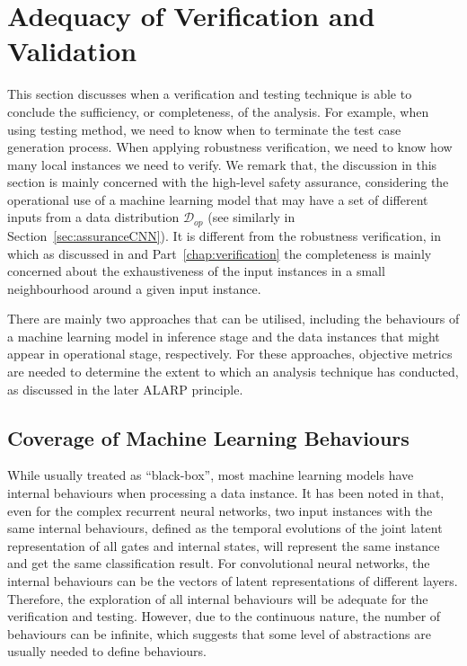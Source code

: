 \section{Adequacy of Verification and Validation}

This section discusses when a verification and testing technique is able to conclude the sufficiency, or completeness, of the analysis. For example, when using testing method, we need to know when to terminate the test case generation process. When applying robustness verification, we need to know how many local instances we need to verify. We remark that, the discussion in this section is mainly concerned with the high-level safety assurance, considering the operational use of a machine learning model that may have a set of different inputs from a data distribution $\mathcal{D}_{op}$ (see similarly in Section~\ref{sec:assuranceCNN}). It is different from the robustness verification, in which as discussed in \cite{HUANG2020100270} and Part~\ref{chap:verification} the completeness is mainly concerned about the exhaustiveness of the input instances in a small neighbourhood around a given input instance. 

There are mainly two approaches that can be utilised, including the behaviours of a machine learning model in inference stage and the data instances that might appear in operational stage, respectively. For these approaches, objective metrics are needed to determine the extent to which an analysis technique has conducted, as discussed in the later ALARP principle.   

\subsection*{Coverage of Machine Learning Behaviours}

While usually treated as ``black-box'', most machine learning models have internal behaviours when processing a data instance. It has been noted in \cite{9451178} that, even for the complex recurrent neural networks, two input instances with the same internal behaviours, defined as the temporal evolutions of the joint latent representation of all gates and internal states, will represent the same instance and get the same classification result. For convolutional neural networks, the internal behaviours can be the vectors of latent representations of different layers. Therefore, the exploration of all internal behaviours will be adequate for the verification and testing. However, due to the continuous nature, the number of behaviours can be infinite, which suggests that some level of abstractions are usually needed to define behaviours. 


